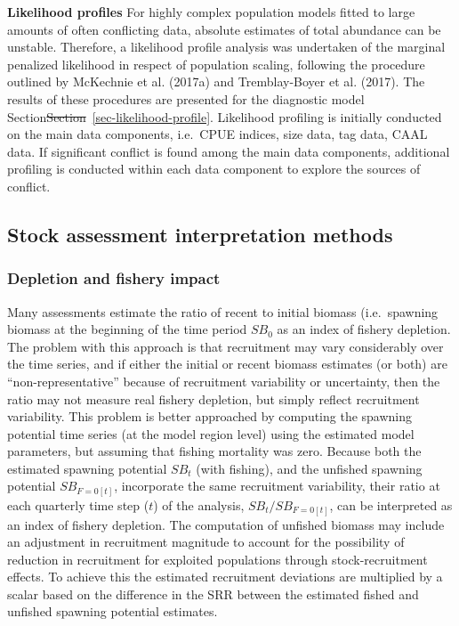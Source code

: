 \documentclass[
  english,
  a4paper,
  a4paper,
  11pt]{SCreport}
\providecommand{\DIFdel}[1]{{\protect\color{red}\sout{#1}}}                      %
\providecommand{\DIFdelbegin}{} %
\providecommand{\DIFdelend}{} %
\newcommand{\DIFscaledelfig}{0.5}
\newlength{\DIFdelgraphicswidth} %
\newlength{\DIFdelgraphicsheight} %
\newcommand{\DIFdelincludegraphics}[2][]{%
\sbox{\DIFdelgraphicsbox}{\DIFOincludegraphics[#1]{#2}}%
\settoboxwidth{\DIFdelgraphicswidth}{\DIFdelgraphicsbox} %
\settoboxtotalheight{\DIFdelgraphicsheight}{\DIFdelgraphicsbox} %
\scalebox{\DIFscaledelfig}{%
\parbox[b]{\DIFdelgraphicswidth}{\usebox{\DIFdelgraphicsbox}\\[-\baselineskip] \rule{\DIFdelgraphicswidth}{0em}}\llap{\resizebox{\DIFdelgraphicswidth}{\DIFdelgraphicsheight}{%
\setlength{\unitlength}{\DIFdelgraphicswidth}%
\begin{picture}(1,1)%
\thicklines\linethickness{2pt} %
{\color[rgb]{1,0,0}\put(0,0){\framebox(1,1){}}}%
{\color[rgb]{1,0,0}\put(0,0){\line( 1,1){1}}}%
{\color[rgb]{1,0,0}\put(0,1){\line(1,-1){1}}}%
\end{picture}%
}\hspace*{3pt}}} %
} %
\DeclareRobustCommand{\DIFdelbegin}{\DIFOdelbegin \let\includegraphics\DIFdelincludegraphics} %
\DeclareRobustCommand{\DIFdelend}{\DIFOaddend \let\includegraphics\DIFOincludegraphics} %
\begin{document}
\textbf{Likelihood profiles} For highly complex population models fitted
to large amounts of often conflicting data, absolute estimates of total
abundance can be unstable. Therefore, a likelihood profile analysis was
undertaken of the marginal penalized likelihood in respect of population
scaling, following the procedure outlined by McKechnie et al. (2017a)
and Tremblay-Boyer et al. (2017). The results of these procedures are
presented for the diagnostic model Section\DIFdelbegin \DIFdel{Section}\DIFdelend ~\ref{sec-likelihood-profile}.
Likelihood profiling is initially conducted on the main data components,
i.e.~CPUE indices, size data, tag data, CAAL data. If significant
conflict is found among the main data components, additional profiling
is conducted within each data component to explore the sources of
conflict.

\subsection{Stock assessment interpretation
methods}\label{sec-stock-assessment-interp}

\subsubsection{Depletion and fishery
impact}\label{sec-methods-fishery-impacts}

Many assessments estimate the ratio of recent to initial biomass
(i.e.~spawning biomass at the beginning of the time period \(SB_{0}\) as
an index of fishery depletion. The problem with this approach is that
recruitment may vary considerably over the time series, and if either
the initial or recent biomass estimates (or both) are
``non-representative'' because of recruitment variability or
uncertainty, then the ratio may not measure real fishery depletion, but
simply reflect recruitment variability. This problem is better
approached by computing the spawning potential time series (at the model
region level) using the estimated model parameters, but assuming that
fishing mortality was zero. Because both the estimated spawning
potential \(SB_t\) (with fishing), and the unfished spawning potential
\(SB_{F=0[t]}\), incorporate the same recruitment variability, their
ratio at each quarterly time step (\(t\)) of the analysis,
\(SB_t/SB_{F=0[t]}\), can be interpreted as an index of fishery
depletion. The computation of unfished biomass may include an adjustment
in recruitment magnitude to account for the possibility of reduction in
recruitment for exploited populations through stock-recruitment effects.
To achieve this the estimated recruitment deviations are multiplied by a
scalar based on the difference in the SRR between the estimated fished
and unfished spawning potential estimates.
\end{document}
